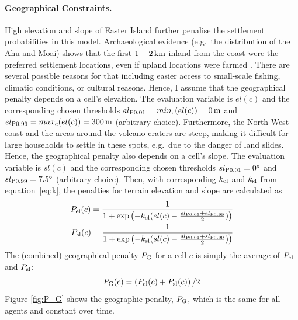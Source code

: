 \paragraph{Geographical Constraints.}%
High elevation and slope of Easter Island further penalise the settlement probabilities in this model.
Archaeological evidence (e.g.\ the distribution of the Ahu and Moai) shows that the first $1-2\, \rm{km}$ inland from the coast were the preferred settlement locations, even if upland locations were farmed \citep{Bahn2017}.
There are several possible reasons for that including easier access to small-scale fishing, climatic conditions, or cultural reasons.
Hence, I assume that the geographical penalty depends on a cell's elevation.
The evaluation variable is $el(c)$ and the corresponding chosen thresholds $el_{\rm P0.01}=min_{\rm c}(el(c))=0\, {\rm m}$ and $el_{\rm P0.99}=max_{\rm c}(el(c)) = 300\, {\rm m}$ (arbitrary choice).
Furthermore, the North West coast and the areas around the volcano craters are steep, making it difficult for large households to settle in these spots, e.g.\ due to the danger of land slides. 
Hence, the geographical penalty also depends on a cell's slope.
The evaluation variable is $sl(c)$ and the corresponding chosen thresholds $sl_{\rm P0.01}=0^\circ$ and $sl_{\rm P0.99}=7.5^\circ$ (arbitrary choice). 
Then, with corresponding $k_{\rm el}$ and $k_{\rm sl}$ from equation~\ref{eq:k}, the penalties for terrain elevation and slope are calculated as 
\begin{eqnarray}
	P_{\text{el}}(c) = \frac{1}{1+\exp\left( - k_{\rm el} (el(c)-\frac{el_{\rm P0.01}+el_{\rm P0.99}}{2}) \right)}\\
	P_{\text{sl}}(c) = \frac{1}{1+\exp\left( - k_{\rm sl} (sl(c)-\frac{sl_{\rm P0.01}+sl_{\rm P0.99}}{2}) \right)}
\end{eqnarray}
The (combined) geographical penalty $P_{\rm G}$ for a cell $c$ is simply the average of $P_{\rm el}$ and $P_{\rm sl}$:
\begin{equation}
P_{\rm G}(c) = \left(P_\text{el}(c)+P_\text{sl}(c) \right)/2
\end{equation}
Figure \ref{fig:P_G} shows the geographic penalty, $P_{\rm G}$, which is the same for all agents and constant over time.
